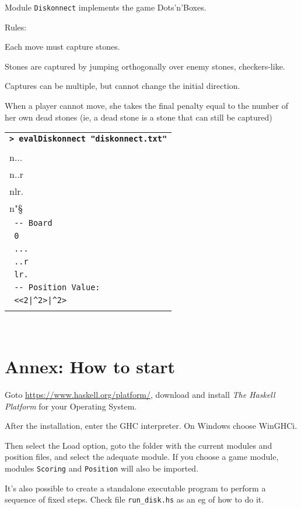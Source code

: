 \documentclass[a4paper,12pt]{article}
\newcommand{\bash}[1]{\small\textbf{\lstinline§> #1§}\\}
\newcommand{\out}[1]{\small\lstinline§ #1§}
\newcommand{\haskellCode}{\fontfamily{pcr}\selectfont}
\newenvironment{sgcode}
	{ \haskellCode
	  \begin{tabular}{|p{0.9\textwidth}|}
      \hline	
	}
	{ \\\hline  
      \end{tabular} \\
	  \par 
	}
\begin{document}
Module \verb|Diskonnect| implements the game Dots'n'Boxes.

Rules:

Each move must capture stones.

Stones are captured by jumping orthogonally over enemy stones, checkers-like.

Captures can be multiple, but cannot change the initial direction.

When a player cannot move, she takes the final penalty equal to the number
of her own dead stones (ie, a dead stone is a stone that can still be captured)

\begin{sgcode}
\bash{evalDiskonnect "diskonnect.txt"}
\out{-- Read: "0\\n...\\n..r\\nlr.\\n"} \\
\out{-- Board} \\
\out{0} \\
\out{...} \\
\out{..r} \\
\out{lr.} \\
\out{-- Position Value:} \\
\out{<<2|^2>|^2>} \\
\end{sgcode}

\newpage \section{Annex: How to start}

Goto \url{https://www.haskell.org/platform/}, download and install \textit{The Haskell Platform} 
for your Operating System.

After the installation, enter the GHC interpreter. On Windows choose WinGHCi. 

Then select the Load option, goto the folder with the current modules and position files,
and select the adequate module. If you choose a game module, modules \verb!Scoring! and
\verb!Position! will also be imported.

It's also possible to create a standalone executable program to perform a sequence of fixed steps. 
Check file \verb!run_disk.hs! as an eg of how to do it.
\end{document}
